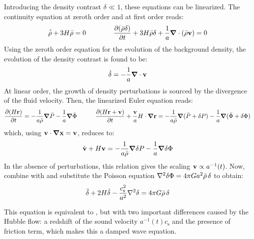 Introducing the density contrast $ \delta \ll 1 $, these equations can be linearized\footnotemark. The continuity equation at zeroth order and at first order reads:
\begin{equation*}
  \dot{\bar \rho} + 3 H \bar \rho = 0
  \qquad \qquad
  \frac{\partial (\bar{\rho} \delta)}{\partial t} + 3 H \bar{\rho} \delta + \frac{1}{a} \boldsymbol{\nabla}\cdot (\bar{\rho} \mathbf{v}) = 0
\end{equation*}
Using the zeroth order equation for the evolution of the background density, the evolution of the density contrast is found to be:
\begin{equation}
  \dot \delta = - \frac{1}{a} \boldsymbol{\nabla}\cdot \mathbf{v}
  \label{eq:density-contrast}
\end{equation}
At linear order, the growth of density perturbations is sourced by the divergence of the fluid velocity. Then, the linearized Euler equation reads:
\begin{equation*}
  \frac{\partial (H \mathbf{r})}{\partial t} = - \frac{1}{a \bar{\rho}} \boldsymbol{\nabla} \bar P - \frac{1}{a} \boldsymbol{\nabla} \bar \Phi
  \qquad \quad
  \frac{\partial (H \mathbf{r} + \mathbf{v})}{\partial t} + \frac{\mathbf{v}}{a} H \cdot \boldsymbol{\nabla} \mathbf{r} = - \frac{1}{a \bar \rho} \boldsymbol{\nabla} (\bar P + \delta P) - \frac{1}{a} \boldsymbol{\nabla} (\bar \Phi + \delta \Phi)
\end{equation*}
which, using $ \mathbf{v} \cdot \boldsymbol{\nabla} \mathbf{x} = \mathbf{v} $, reduces to:
\begin{equation}
  \dot{\mathbf{v}} + H \mathbf{v} = - \frac{1}{a \bar \rho} \boldsymbol{\nabla} \delta P - \frac{1}{a} \boldsymbol{\nabla} \delta \Phi
  \label{eq:peculiar-velocity}
\end{equation}
In the absence of perturbations, this relation gives the scaling $ \mathbf{v} \propto a^{-1}(t) $. Now, combine  with  and substitute the Poisson equation $ \nabla^2 \delta \Phi = 4\pi G a^2 \bar \rho \, \delta $ to obtain:
\begin{equation}
  \ddot{\delta} + 2 H \dot{\delta} - \frac{c_\text{s}^2}{a^2} \nabla^2 \delta = 4\pi G \bar \rho \, \delta
  \label{eq:wave-newton}
\end{equation}


This equation is equivalent to , but with two important differences caused by the Hubble flow: a redshift of the sound velocity $ a^{-1}(t) c_\text{s} $ and the presence of friction term, which makes this a damped wave equation.

